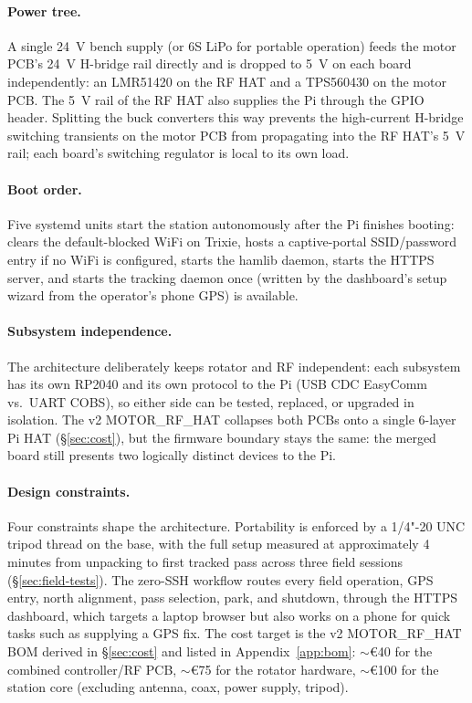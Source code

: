 \paragraph{Power tree.}
A single 24~V bench supply (or 6S LiPo for portable operation) feeds the motor PCB's 24~V H-bridge rail directly and is dropped to 5~V on each board independently: an LMR51420 on the RF HAT and a TPS560430 on the motor PCB. The 5~V rail of the RF HAT also supplies the Pi through the GPIO header. Splitting the buck converters this way prevents the high-current H-bridge switching transients on the motor PCB from propagating into the RF HAT's 5~V rail; each board's switching regulator is local to its own load.

\paragraph{Boot order.}
Five systemd units start the station autonomously after the Pi finishes booting:  clears the default-blocked WiFi on Trixie,  hosts a captive-portal SSID/password entry if no WiFi is configured,  starts the hamlib daemon,  starts the HTTPS server, and  starts the tracking daemon once  (written by the dashboard's setup wizard from the operator's phone GPS) is available.

\paragraph{Subsystem independence.}
The architecture deliberately keeps rotator and RF independent: each subsystem has its own RP2040 and its own protocol to the Pi (USB CDC EasyComm vs.\ UART COBS), so either side can be tested, replaced, or upgraded in isolation. The v2 MOTOR\_RF\_HAT collapses both PCBs onto a single 6-layer Pi HAT (\S\ref{sec:cost}), but the firmware boundary stays the same: the merged board still presents two logically distinct devices to the Pi.

\paragraph{Design constraints.}
Four constraints shape the architecture. Portability is enforced by a 1/4"-20 UNC tripod thread on the base, with the full setup measured at approximately 4 minutes from unpacking to first tracked pass across three field sessions (\S\ref{sec:field-tests}). The zero-SSH workflow routes every field operation, GPS entry, north alignment, pass selection, park, and shutdown, through the HTTPS dashboard, which targets a laptop browser but also works on a phone for quick tasks such as supplying a GPS fix. The cost target is the v2 MOTOR\_RF\_HAT BOM derived in \S\ref{sec:cost} and listed in Appendix~\ref{app:bom}: $\sim$€40 for the combined controller/RF PCB, $\sim$€75 for the rotator hardware, $\sim$€100 for the station core (excluding antenna, coax, power supply, tripod).

